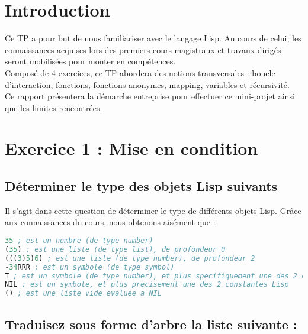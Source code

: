 \documentclass[a4paper, 12pt]{article}
\begin{document}
\tableofcontents

\newpage

\section*{Introduction}

Ce TP a pour but de nous familiariser avec le langage Lisp. Au cours de celui, les connaissances acquises lors des premiers cours magistraux et travaux dirigés seront mobilisées pour monter en compétences.\\

Composé de 4 exercices, ce TP abordera des notions transversales : boucle d’interaction, fonctions, fonctions anonymes, mapping, variables et récursivité. \\

Ce rapport présentera la démarche entreprise pour effectuer ce mini-projet ainsi que les limites rencontrées.

\newpage


\section{Exercice 1 : Mise en condition}

\subsection{Déterminer le type des objets Lisp suivants}
\vspace{3mm}
Il s'agit dans cette question de déterminer le type de différents objets Lisp. Grâce aux connaissances du cours, nous obtenons aisément que :
\vspace{2mm}
\begin{lstlisting}[language=Lisp]
35 ; est un nombre (de type number)
(35) ; est une liste (de type list), de profondeur 0
(((3)5)6) ; est une liste (de type number), de profondeur 2
-34RRR ; est un symbole (de type symbol)
T ; est un symbole (de type number), et plus specifiquement une des 2 constantes Lisp qui signifie "valeur non nulle" autrement dit "true"
NIL ; est un symbole, et plus precisement une des 2 constantes Lisp
() ; est une liste vide evaluee a NIL
\end{lstlisting}

\subsection{Traduisez sous forme d’arbre la liste suivante :}
\end{document}
